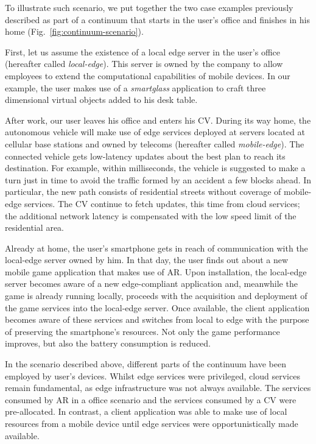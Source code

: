 To illustrate such scenario, we put together the two case examples previously described as part of a continuum that starts in the user's office and finishes in his home (Fig.~\ref{fig:continuum-scenario}). 

First, let us assume the existence of a local edge server in the user's office (hereafter called \textit{local-edge}). This server is owned by the company to allow employees to extend the computational capabilities of mobile devices. In our example, the user makes use of a \textit{smartglass} application to craft three dimensional virtual objects added to his desk table.

After work, our user leaves his office and enters his CV. During its way home, the autonomous vehicle will make use of edge services deployed at servers located at cellular base stations and owned by telecoms (hereafter called \textit{mobile-edge}). The connected vehicle gets low-latency updates about the best plan to reach its destination. For example, within milliseconds, the vehicle is suggested to make a turn just in time to avoid the traffic formed by an accident a few blocks ahead. In particular, the new path consists of residential streets without coverage of mobile-edge services. The CV continue to fetch updates, this time from cloud services; the additional network latency is compensated with the low speed limit of the residential area.

Already at home, the user's smartphone gets in reach of communication with the local-edge server owned by him. In that day, the user finds out about a new mobile game application that makes use of AR. Upon installation, the local-edge server becomes aware of a new edge-compliant application and, meanwhile the game is already running locally, proceeds with the acquisition and deployment of the game services into the local-edge server. Once available, the client application becomes aware of these services and switches from local to edge with the purpose of preserving the smartphone's resources. Not only the game performance improves, but also the battery consumption is reduced.  

In the scenario described above, different parts of the continuum have been employed by user's devices. Whilst edge services were privileged, cloud services remain fundamental, as edge infrastructure was not always available. The services consumed by AR in a office scenario and the services consumed by a CV were pre-allocated. In contrast, a client application was able to make use of local resources from a mobile device until edge services were opportunistically made available. 

